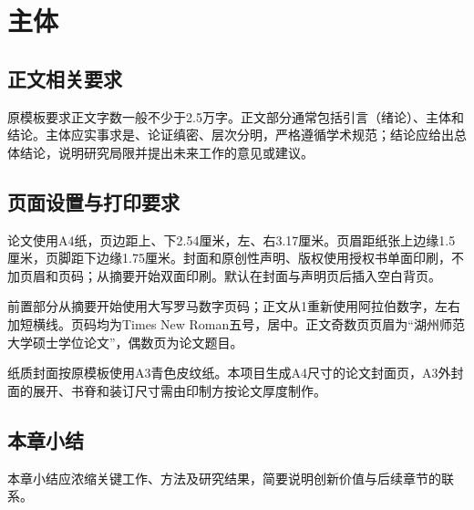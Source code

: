 \chapter{主体}
\section{正文相关要求}
原模板要求正文字数一般不少于2.5万字。正文部分通常包括引言（绪论）、主体和结论。主体应实事求是、论证缜密、层次分明，严格遵循学术规范；结论应给出总体结论，说明研究局限并提出未来工作的意见或建议。
\section{页面设置与打印要求}
论文使用A4纸，页边距上、下2.54厘米，左、右3.17厘米。页眉距纸张上边缘1.5厘米，页脚距下边缘1.75厘米。封面和原创性声明、版权使用授权书单面印刷，不加页眉和页码；从摘要开始双面印刷。默认在封面与声明页后插入空白背页。

前置部分从摘要开始使用大写罗马数字页码；正文从1重新使用阿拉伯数字，左右加短横线。页码均为Times New Roman五号，居中。正文奇数页页眉为“湖州师范大学硕士学位论文”，偶数页为论文题目。

纸质封面按原模板使用A3青色皮纹纸。本项目生成A4尺寸的论文封面页，A3外封面的展开、书脊和装订尺寸需由印制方按论文厚度制作。
\section{本章小结}
本章小结应浓缩关键工作、方法及研究结果，简要说明创新价值与后续章节的联系。
